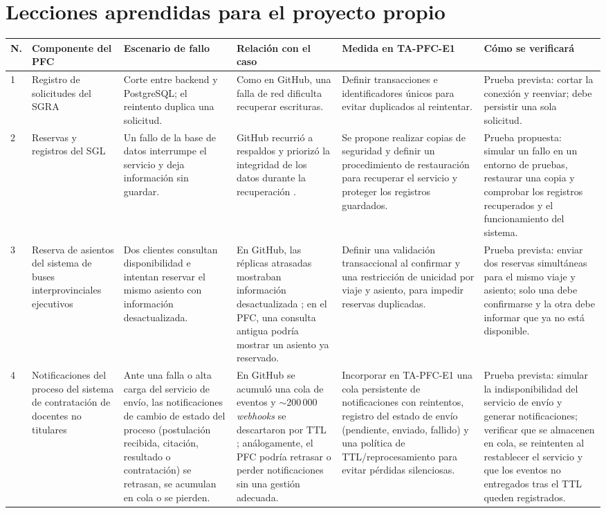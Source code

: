\documentclass[11pt,a4paper]{article}
\begin{document}
\section{Lecciones aprendidas para el proyecto propio}
\begingroup\scriptsize
\begin{tabularx}{\linewidth}{@{}p{0.4cm}p{1.9cm}XXXX@{}}
\toprule
N. & Componente del PFC & Escenario de fallo & Relaci\'on con el caso & Medida en TA-PFC-E1 & C\'omo se verificar\'a\\
\midrule
1 & Registro de solicitudes del SGRA & Corte entre backend y PostgreSQL; el reintento duplica una solicitud. & Como en GitHub, una falla de red dificulta recuperar escrituras. & Definir transacciones e identificadores únicos para evitar duplicados al reintentar. & Prueba prevista: cortar la conexión y reenviar; debe persistir una sola solicitud.\\
2 & Reservas y registros del SGL & Un fallo de la base de datos interrumpe el servicio y deja informaci\'on sin guardar. & GitHub recurri\'o a respaldos y prioriz\'o la integridad de los datos durante la recuperaci\'on \cite{github2018}. & Se propone realizar copias de seguridad y definir un procedimiento de restauraci\'on para recuperar el servicio y proteger los registros guardados. & Prueba propuesta: simular un fallo en un entorno de pruebas, restaurar una copia y comprobar los registros recuperados y el funcionamiento del sistema.\\
3 & Reserva de asientos del sistema de buses interprovinciales ejecutivos
& Dos clientes consultan disponibilidad e intentan reservar el mismo asiento con información desactualizada.
& En GitHub, las réplicas atrasadas mostraban información desactualizada \cite{github2018}; en el PFC, una consulta antigua podría mostrar un asiento ya reservado.
& Definir una validación transaccional al confirmar y una restricción de unicidad por viaje y asiento, para impedir reservas duplicadas.
& Prueba prevista: enviar dos reservas simultáneas para el mismo viaje y asiento; solo una debe confirmarse y la otra debe informar que ya no está disponible.\\
4 & Notificaciones del proceso del sistema de contrataci\'on de docentes no titulares
& Ante una falla o alta carga del servicio de env\'io, las notificaciones de cambio de estado del proceso (postulaci\'on recibida, citaci\'on, resultado o contrataci\'on) se retrasan, se acumulan en cola o se pierden.
& En GitHub se acumul\'o una cola de eventos y $\sim$200\,000 \textit{webhooks} se descartaron por TTL \cite{github2018}; an\'alogamente, el PFC podr\'ia retrasar o perder notificaciones sin una gesti\'on adecuada.
& Incorporar en TA-PFC-E1 una cola persistente de notificaciones con reintentos, registro del estado de env\'io (pendiente, enviado, fallido) y una pol\'itica de TTL/reprocesamiento para evitar p\'erdidas silenciosas.
& Prueba prevista: simular la indisponibilidad del servicio de env\'io y generar notificaciones; verificar que se almacenen en cola, se reintenten al restablecer el servicio y que los eventos no entregados tras el TTL queden registrados.\\
\bottomrule
\end{tabularx}
\endgroup
\end{document}
